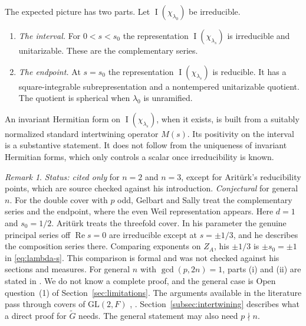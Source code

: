 \documentclass[12pt,letterpaper]{article}
\numberwithin{equation}{section}
\theoremstyle{plain}
\theoremstyle{definition}
\theoremstyle{remark}
\newcounter{uvc}
\newtheorem{uvremark}[uvc]{Remark}
\newcommand{\Gt}{\widetilde G}
\newcommand{\ZA}{Z_A}
\DeclareMathOperator{\PI}{I}
\newcommand{\GL}{\mathrm{GL}}
\begin{document}
The expected picture has two parts. Let $\PI(\chi_{\lambda_0})$ be
irreducible.
\begin{enumerate}[label=(\roman*),leftmargin=*]
\item \emph{The interval.} For $0<s<s_0$ the representation
  $\PI(\chi_{\lambda_s})$ is irreducible and unitarizable. These are
  the complementary series.
\item \emph{The endpoint.} At $s=s_0$ the representation
  $\PI(\chi_{\lambda_s})$ is reducible. It has a square-integrable
  subrepresentation and a nontempered unitarizable quotient. The
  quotient is spherical when $\lambda_0$ is unramified.
\end{enumerate}
An invariant Hermitian form on $\PI(\chi_{\lambda_s})$, when it exists,
is built from a suitably normalized standard intertwining operator
$M(s)$. Its positivity on the interval is a substantive statement. It
does not follow from the uniqueness of invariant Hermitian forms, which
only controls a scalar once irreducibility is known.

\begin{uvremark}\label{uv:complementary}
\emph{Status: cited only} for $n=2$ and $n=3$, except for Arit\"urk's
reducibility points, which are source checked against his
introduction. \emph{Conjectural} for general $n$. For the double cover
with $p$ odd, Gelbart and Sally \cite{GS75,Ge76} treat the
complementary series and the endpoint, where the even Weil
representation appears. Here $d=1$ and $s_0=1/2$. Arit\"urk \cite{Ar80}
treats the threefold cover. In his parameter the genuine principal
series off $\operatorname{Re}s=0$ are irreducible except at
$s=\pm1/3$, and he describes the composition series there. Comparing
exponents on $\ZA$, his $\pm1/3$ is $\pm s_0=\pm1$ in \eqref{eq:lambda-s}.
This comparison is formal and was not checked against his sections and
measures. For general $n$ with $\gcd(p,2n)=1$, parts (i) and (ii) are
stated in \cite[\S3]{Jo01}. We do not know a complete proof, and the
general case is Open question~(1) of Section~\ref{sec:limitations}. The
arguments available in the literature pass through covers of
$\GL(2,F)$ \cite[\S\S26--27]{FK86}, \cite[Thm.~II.2.1]{KP84}.
Section~\ref{subsec:intertwining} describes what a direct proof for
$\Gt$ needs. The general statement may also need $p\nmid n$.
\end{uvremark}
\end{document}
